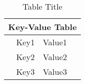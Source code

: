 
\begin{table}[h] %
    \centering
    \caption{Table Title}
    \begin{tabular}{r | l}
        \hline
        \multicolumn{2}{c}{Key-Value Table} \\ \hline
        Key1 & Value1 \\ 
        Key2 & Value2 \\
        Key3 & Value3 \\
    \end{tabular}
    \label{tab:table1}
\end{table}

